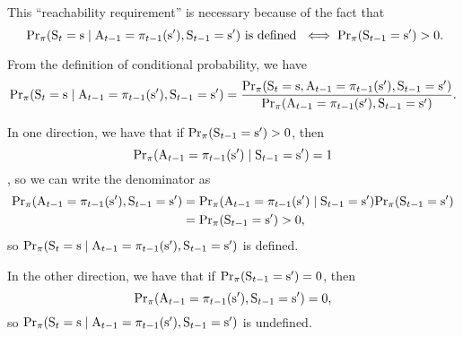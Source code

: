 \documentclass{rl_theory/note}
\begin{document}
\begin{note}
  \def\quant{\PSTT(\SV_\TT = \SS \mid \AV_\TTM = \STT_\TTM(\SS'), \SV_\TTM = \SS')}
  This ``reachability requirement'' is necessary
  because of the fact that
  $$\text{ $\quant$ is defined } 
  \iff \PSTT(\SV_{\TT - 1} = \SS') > 0.$$%

  From the definition of conditional probability, we have
  $$ \quant 
  = \frac{\PSTT(\SV_\TT = \SS, \AV_\TTM = \STT_\TTM(\SS'), \SV_\TTM = \SS')}
    {\PSTT(\AV_\TTM = \STT_\TTM(\SS'), \SV_\TTM = \SS')}.$$

  In one direction, we have that if ${\rm Pr}_{\pi}({\rm S}_{t - 1} = {\rm s}') > 0$, then 
  $${\rm Pr}_{\pi}({\rm A}_{t - 1} = \pi_{t - 1}({\rm s}')\mid {\rm S}_{t - 1} = {\rm s}') = 1$$ 
  , so
  we can write the denominator as
  \begin{align*}
    {\rm Pr}_{\pi}({\rm A}_{t - 1} = \pi_{t - 1}({\rm s}'), {\rm S}_{t - 1} = {\rm s}') &= {\rm Pr}_{\pi}({\rm A}_{t - 1} = \pi_{t - 1}({\rm s}')\mid {\rm S}_{t - 1} = {\rm s}')
    {\rm Pr}_{\pi}({\rm S}_{t - 1} = {\rm s}')\\
                                                     &= {\rm Pr}_{\pi}({\rm S}_{t - 1} = {\rm s}') > 0,
  \end{align*}
  so $\quant$ is defined.

  In the other direction, we have that if ${\rm Pr}_{\pi}({\rm S}_{t - 1} = {\rm s}') = 0$, then 
  $$ {\rm Pr}_{\pi}({\rm A}_{t - 1} = \pi_{t - 1}({\rm s}'), {\rm S}_{t - 1} = {\rm s}') = 0,$$ 
  so $\quant$
  is undefined.
\end{note}
\end{document}
